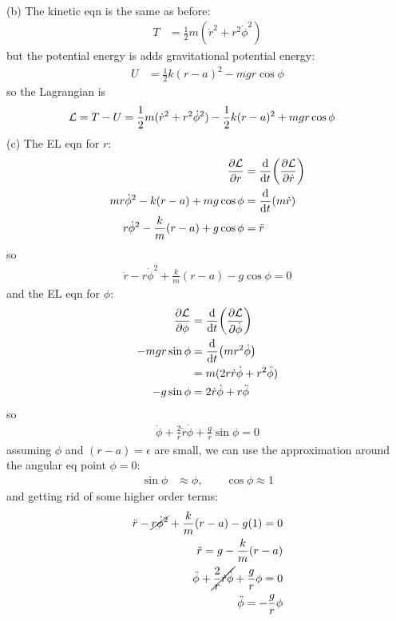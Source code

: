 \documentclass[../hw.tex]{subfiles}
\begin{document}
\paragraph*{}(b) The kinetic eqn is the same as before:
\begin{align*}
    T &= \frac{1}{2} m (\dot r^2 + r^2 \dot\phi^2)
\end{align*}
but the potential energy is adds gravitational potential energy:
\begin{align*}
    U &= \frac{1}{2} k(r - a)^2 - mgr\cos\phi
\end{align*}
so the Lagrangian is
\begin{align*}
    \mathcal{L} &= T - U = \frac{1}{2} m (\dot r^2 + r^2 \dot\phi^2) - \frac{1}{2} k(r - a)^2 + mgr\cos\phi
\end{align*}
(c) The EL eqn for $r$:
\begin{align*}
    \pdv{\mathcal{L}}{r} &= \dv{t}(\pdv{\mathcal{L}}{\dot r}) \\
    mr\dot\phi^2 -k(r - a) + mg\cos\phi &= \dv{t}(m\dot r) \\
    r\dot\phi^2 -\frac{k}{m}(r - a) + g\cos\phi &= \ddot r \\
\end{align*}
so
\begin{align*}
    \ddot r - r \dot\phi^2 + \frac{k}{m}(r - a) - g\cos\phi = 0
\end{align*}
and the EL eqn for $\phi$:
\begin{align*}
    \pdv{\mathcal{L}}{\phi} &= \dv{t}(\pdv{\mathcal{L}}{\dot \phi}) \\
    -mgr\sin\phi &= \dv{t}(m r^2\dot\phi) \\
    &= m(2r \dot r \dot\phi + r^2 \ddot\phi) \\
    -g \sin\phi &= 2 \dot r \dot\phi + r \ddot\phi
\end{align*}
so \begin{align*}
    \ddot \phi + \frac{2}{r} \dot r \dot\phi + \frac{g}{r}\sin\phi = 0
\end{align*}
assuming $\phi$ and $(r - a) = \epsilon$ are small, we can use the approximation around the 
angular eq point $\phi = 0$:
\begin{align*}
    \sin\phi &\approx \phi, \qquad \cos\phi \approx 1
\end{align*}
and getting rid of some higher order terms:
\begin{align*}
    \ddot r - \cancel{r \dot\phi^2} + \frac{k}{m}(r - a ) - g(1) = 0 \\
    \ddot r = g - \frac{k}{m}(r - a) \\
    \ddot \phi + \cancel{\frac{2}{r} \dot r \dot\phi} + \frac{g}{r}\phi = 0 \\
    \ddot \phi =- \frac{g}{r}\phi
\end{align*}
\end{document}
